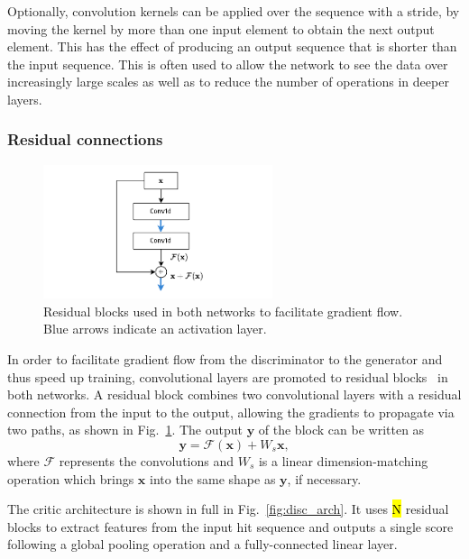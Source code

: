 Optionally, convolution kernels can be applied over the sequence with a stride, by moving the kernel by more than one input element to obtain the next output element. This has the effect of producing an output sequence that is shorter than the input sequence. This is often used to allow the network to see the data over increasingly large scales as well as to reduce the number of operations in deeper layers. 

\subsubsection{Residual connections}
\begin{figure}
    \centering
    \includegraphics[width=0.6\textwidth]{chapter4/residual_sel.drawio.pdf}
    \caption{Residual blocks used in both networks to facilitate gradient flow. Blue arrows indicate an activation layer.}
    \label{fig:residual_block}
\end{figure}
In order to facilitate gradient flow from the discriminator to the generator and thus speed up training, convolutional layers are promoted to residual blocks~\cite{he2016deep} in both networks. A residual block combines two convolutional layers with a residual connection from the input to the output, allowing the gradients to propagate via two paths, as shown in Fig.~\ref{fig:residual_block}. The output $\mathbf{y}$ of the block can be written as
\begin{equation*}
    \mathbf{y} = \mathcal{F}(\mathbf{x}) + W_s\mathbf{x},
\end{equation*}
where $\mathcal{F}$ represents the convolutions and $W_s$ is a linear dimension-matching operation which brings $\mathbf{x}$ into the same shape as $\mathbf{y}$, if necessary.
    
The critic architecture is shown in full in Fig.~\ref{fig:disc_arch}. It uses \hl{N} residual blocks to extract features from the input hit sequence and outputs a single score following a global pooling operation and a fully-connected linear layer.

